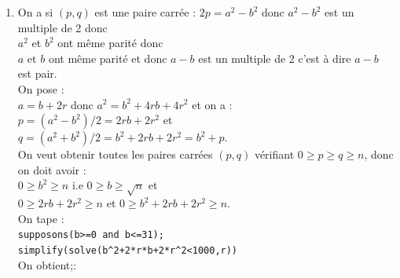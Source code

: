 \documentclass[a4paper,11pt]{book}
\begin{document}
\begin{enumerate}
soit $a^2-b^2=3 \bmod 4$.\\ 
et puisque $a^2-b^2=0 $ est pair, on en d\'eduit qu $a^2-b^2=0 \bmod 4$ 
on en d\'eduit que $p$ est pair.\\
On tape :
\begin{verbatim}
paire_carre2(n):={
local a,b,q,p,L;
L:=NULL;
pour p de 0 jusque n pas 2 faire
pour q de p jusque n faire
a:=sqrt(q+p);
b:=sqrt(q-p);
si (a==floor(a) et b==floor(b)) alors
L:=L,[p,q];
fsi
fpour
fpour
return L
}:;
\end{verbatim}
On tape :\\
{\tt L2:=paire\_carre2()}\\
On obtient comme pr\'ec\'edement (Evaluation time: 1.36) :
\begin{verbatim}
[0,0],[0,1],[0,4],[0,9],[0,16],[0,25],[0,36],[0,49],
[0,64],[0,81],[0,100],[2,2],[4,5],[6,10],[8,8],[8,17],
[10,26],[12,13],[12,37],[14,50],[16,20],[16,65],
[18,18],[18,82],[20,29],[24,25],[24,40],[28,53],
[30,34],[32,32],[32,68],[36,45],[36,85],[40,41],[42,58],
[48,52],[48,73],[50,50],[54,90],[56,65],[60,61],[64,80],
[70,74],[72,72],[72,97],[80,89],[84,85],[96,100],[98,98]
\end{verbatim}
On tape : {\tt dim(L2)}\\
On obtient; {\tt 49}
\item On a si $(p,q)$ est une paire carr\'ee :
$2p=a^2-b^2$ donc $a^2-b^2$ est un multiple de 2 donc\\
$a^2$ et $b^2$ ont m\^eme parit\'e donc\\
$a$ et $b$ ont m\^eme parit\'e et donc $a-b$ est un multiple de 2 c'est \`a 
dire $a-b$ est pair.\\
On pose :\\
$a=b+2r$
donc $a^2=b^2+4rb+4r^2$ et on a :\\
$p=(a^2-b^2)/2=2rb+2r^2$ et \\
$q=(a^2+b^2)/2=b^2+2rb+2r^2=b^2+p$.\\
On veut obtenir toutes les paires carr\'ees $(p,q)$ v\'erifiant 
$0 \geq p \geq q \geq n$, donc on doit avoir :\\
$0\geq b^2 \geq n$ i.e $0\geq b \geq \sqrt n$ et\\
$0\geq 2rb+2r^2\geq n$ et $0\geq b^2+2rb+2r^2\geq n$.\\
On tape : \\
{\tt supposons(b>=0 and b<=31);}\\
{\tt simplify(solve(b\verb|^|2+2*r*b+2*r\verb|^|2<1000,r))}\\
On obtient;:\\

\end{enumerate}
\end{document}
